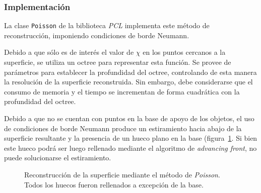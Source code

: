 	\subsubsection{Implementación}
	La clase \texttt{Poisson} de la biblioteca \emph{PCL} implementa este método de reconstrucción,
	imponiendo condiciones de borde Neumann.

	Debido a que sólo es de interés el valor de $\chi$ en los puntos cercanos a
	la superficie, se utiliza un octree para representar esta función. Se
	provee de parámetros para establecer la profundidad del octree, controlando
	de esta manera la resolución de la superficie reconstruida.
	Sin embargo, debe considerarse que el consumo de memoria y el tiempo se incrementan de forma
	cuadrática con la profundidad del octree.

	Debido a que no se cuentan con puntos en la base de apoyo de los objetos,
	el uso de condiciones de borde Neumann
	produce un estiramiento hacia abajo de la superficie resultante y la presencia de
	un hueco plano en la base (figura~\ref{fig:fill_poisson}.
	Si bien este hueco podrá ser luego rellenado mediante el algoritmo de \emph{advancing front},
	no puede solucionarse el estiramiento.



	\begin{figure}
		 
		\caption{\label{fig:fill_poisson}Reconstrucción de la superficie mediante el método de \emph{Poisson}. Todos los huecos fueron rellenados a excepción de la base.}
	\end{figure}

